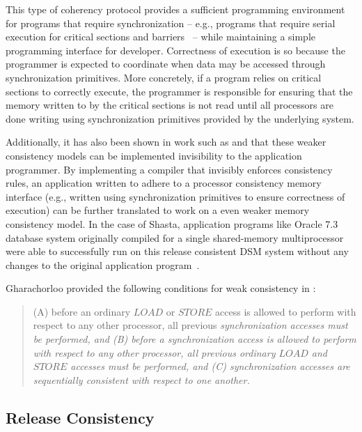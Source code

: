 This type of coherency protocol provides a sufficient programming environment for programs that require synchronization -- e.g., programs that require serial execution for critical sections and barriers~\cite{Steinke:2004:UTS:1017460.1017464} -- while maintaining a simple programming interface for developer.  Correctness of execution is so because the programmer is expected to coordinate when data may be accessed through synchronization primitives.  More concretely, if a program relies on critical sections to correctly execute, the programmer is responsible for ensuring that the memory written to by the critical sections is not read until all processors are done writing using synchronization primitives provided by the underlying system.

Additionally, it has also been shown in work such as \cite{Scheurich:1987:CMO:30350.30377} and \cite{Scales:1997:TTE:268998.266673} that these weaker consistency models can be implemented invisibility to the application programmer.  By implementing a compiler that invisibly enforces consistency rules, an application written to adhere to a processor consistency memory interface (e.g., written using synchronization primitives to ensure correctness of execution) can be further translated to work on a even weaker memory consistency model.  In the case of Shasta, application programs like Oracle 7.3 database system originally compiled for a single shared-memory multiprocessor were able to successfully run on this release consistent DSM system without any changes to the original application program~\cite{Scales:1997:TTE:268998.266673}.

Gharachorloo provided the following conditions for weak consistency in \cite{Gharachorloo:1990:MCE:325164.325102}:

\begin{quote}
\begin{condition}
(A) before an ordinary $LOAD$ or $STORE$ access is allowed to perform with respect to any other processor, all previous \em synchronization \em accesses must be performed, and (B) before a \em synchronization \em access is allowed to perform with respect to any other processor, all previous ordinary $LOAD$ and $STORE$ accesses must be performed, and (C) \em synchronization \em accesses are sequentially consistent with respect to one another.
\end{condition}
\end{quote}

\subsection{Release Consistency}
\label{release-consistency}

